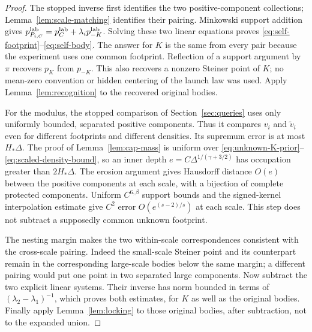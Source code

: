 \begin{proof}
The stopped inverse first identifies the two positive-component
collections; Lemma~\ref{lem:scale-matching} identifies their pairing.
Minkowski support addition gives
$p_{P_{i,C}}^{\rm lab}=p_C^{\rm lab}+\lambda_i p_{-K}^{\rm lab}$.
Solving these two linear equations proves
\eqref{eq:self-footprint}--\eqref{eq:self-body}. The answer for $K$
is the same from every pair because the experiment uses one common
footprint. Reflection of a support argument by $\pi$ recovers $p_K$
from $p_{-K}$. This also recovers a nonzero Steiner point of $K$;
no mean-zero convention or hidden centering of the launch law was used.
Apply Lemma~\ref{lem:recognition} to the recovered original bodies.

For the modulus, the stopped comparison of Section~\ref{sec:queries}
uses only uniformly bounded, separated positive components. Thus it
compares $v_i$ and $\widetilde v_i$ even for different footprints and
different densities. Its supremum error is at most $H_*\Delta$.
The proof of Lemma~\ref{lem:cap-mass} is uniform over
\eqref{eq:unknown-K-prior}--\eqref{eq:scaled-density-bound}, so an
inner depth $e=C\Delta^{1/(\gamma+3/2)}$ has occupation greater
than $2H_*\Delta$. The erosion argument gives Hausdorff distance
$O(e)$ between the positive components at each scale, with a bijection
of complete protected components. Uniform $C^{6,\beta}$ support bounds
and the signed-kernel interpolation estimate give $C^2$ error
$O(e^{(s-2)/s})$ at each scale. This step does not subtract a supposedly
common unknown footprint.

The nesting margin makes the two within-scale correspondences consistent
with the cross-scale pairing. Indeed the small-scale Steiner point and
its counterpart remain in the corresponding large-scale bodies below
the same margin; a different pairing would put one point in two
separated large components. Now subtract the two explicit linear systems.
Their inverse has norm bounded in terms of
$(\lambda_2-\lambda_1)^{-1}$, which proves both estimates, for $K$
as well as the original bodies. Finally apply Lemma~\ref{lem:locking}
to those original bodies, after subtraction, not to the expanded union.
\end{proof}

